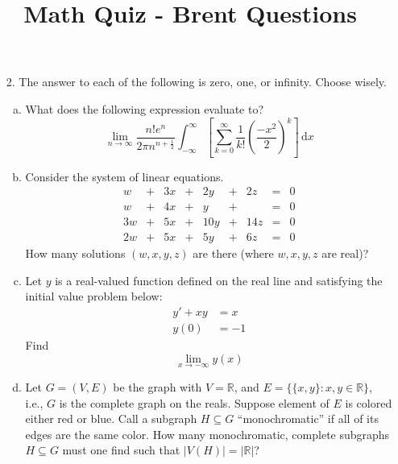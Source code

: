 \documentclass{article}
\title{Math Quiz - Brent Questions}
\begin{document}
\maketitle 

\begin{itemize}
  \item[2.] The answer to each of the following is zero, one, or
    infinity.  Choose wisely.

    \begin{enumerate}[(a)]
      \item What does the following expression evaluate to?
        \[
          \lim_{n \to \infty} \frac{n!e^{n}}{2\pi n^{n + \frac{1}{2}}}
          \int_{-\infty}^{\infty} \left[
            \sum_{k=0}^{\infty} 
            \frac{1}{k!}
            \left(\frac{-x^2}{2}\right)^k
          \right]
          \,\mathrm{d}x
        \]

      \item Consider the system of linear equations.
        \[
          \begin{array}{rcrcrcrcr}
            w   &+& 3x  &+& 2y  &+& 2z  &=& 0 \\
            w   &+& 4x  &+& y   &+&     &=& 0 \\
            3w  &+& 5x  &+& 10y &+& 14z &=& 0 \\
            2w  &+& 5x  &+& 5y  &+& 6z  &=& 0
          \end{array}
        \]
        How many solutions $(w, x, y, z)$ are there (where $w, x, y, z$
        are real)?

      \item Let $y$ is a real-valued function defined on the real line
        and satisfying the initial value problem below:
        \begin{align*}
          y' + xy &= x \\
          y(0) &= -1
        \end{align*}
        Find
        \[
          \lim_{x \to -\infty} y(x)
        \]

      \item Let $G = (V, E)$ be the graph with $V = \mathbb{R}$, and
        $E = \{\{x, y\} : x, y \in \mathbb{R} \}$, i.e., $G$ is the
        complete graph on the reals.  Suppose element of $E$ is colored
        either red or blue.  Call a subgraph $H \subseteq G$
        ``monochromatic'' if all of its edges are the same color.  How
        many monochromatic, complete subgraphs $H \subseteq G$ must one
        find such that $|V(H)| = |\mathbb{R}|$?


\end{enumerate}
\end{itemize}
\end{document}
